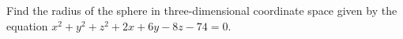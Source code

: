 Find the radius of the sphere in three-dimensional coordinate space given by the equation $x^{2}+y^{2}+z^{2}+2x+6y-8z-74=0$.
